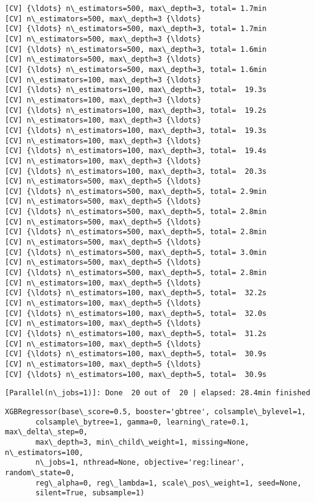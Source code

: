 \documentclass[11pt]{article}
\begin{document}
    \begin{Verbatim}[commandchars=\\\{\}]
[CV] {\ldots} n\_estimators=500, max\_depth=3, total= 1.7min
[CV] n\_estimators=500, max\_depth=3 {\ldots}
[CV] {\ldots} n\_estimators=500, max\_depth=3, total= 1.7min
[CV] n\_estimators=500, max\_depth=3 {\ldots}
[CV] {\ldots} n\_estimators=500, max\_depth=3, total= 1.6min
[CV] n\_estimators=500, max\_depth=3 {\ldots}
[CV] {\ldots} n\_estimators=500, max\_depth=3, total= 1.6min
[CV] n\_estimators=100, max\_depth=3 {\ldots}
[CV] {\ldots} n\_estimators=100, max\_depth=3, total=  19.3s
[CV] n\_estimators=100, max\_depth=3 {\ldots}
[CV] {\ldots} n\_estimators=100, max\_depth=3, total=  19.2s
[CV] n\_estimators=100, max\_depth=3 {\ldots}
[CV] {\ldots} n\_estimators=100, max\_depth=3, total=  19.3s
[CV] n\_estimators=100, max\_depth=3 {\ldots}
[CV] {\ldots} n\_estimators=100, max\_depth=3, total=  19.4s
[CV] n\_estimators=100, max\_depth=3 {\ldots}
[CV] {\ldots} n\_estimators=100, max\_depth=3, total=  20.3s
[CV] n\_estimators=500, max\_depth=5 {\ldots}
[CV] {\ldots} n\_estimators=500, max\_depth=5, total= 2.9min
[CV] n\_estimators=500, max\_depth=5 {\ldots}
[CV] {\ldots} n\_estimators=500, max\_depth=5, total= 2.8min
[CV] n\_estimators=500, max\_depth=5 {\ldots}
[CV] {\ldots} n\_estimators=500, max\_depth=5, total= 2.8min
[CV] n\_estimators=500, max\_depth=5 {\ldots}
[CV] {\ldots} n\_estimators=500, max\_depth=5, total= 3.0min
[CV] n\_estimators=500, max\_depth=5 {\ldots}
[CV] {\ldots} n\_estimators=500, max\_depth=5, total= 2.8min
[CV] n\_estimators=100, max\_depth=5 {\ldots}
[CV] {\ldots} n\_estimators=100, max\_depth=5, total=  32.2s
[CV] n\_estimators=100, max\_depth=5 {\ldots}
[CV] {\ldots} n\_estimators=100, max\_depth=5, total=  32.0s
[CV] n\_estimators=100, max\_depth=5 {\ldots}
[CV] {\ldots} n\_estimators=100, max\_depth=5, total=  31.2s
[CV] n\_estimators=100, max\_depth=5 {\ldots}
[CV] {\ldots} n\_estimators=100, max\_depth=5, total=  30.9s
[CV] n\_estimators=100, max\_depth=5 {\ldots}
[CV] {\ldots} n\_estimators=100, max\_depth=5, total=  30.9s

    \end{Verbatim}

    \begin{Verbatim}[commandchars=\\\{\}]
[Parallel(n\_jobs=1)]: Done  20 out of  20 | elapsed: 28.4min finished

    \end{Verbatim}

    \begin{Verbatim}[commandchars=\\\{\}]
XGBRegressor(base\_score=0.5, booster='gbtree', colsample\_bylevel=1,
       colsample\_bytree=1, gamma=0, learning\_rate=0.1, max\_delta\_step=0,
       max\_depth=3, min\_child\_weight=1, missing=None, n\_estimators=100,
       n\_jobs=1, nthread=None, objective='reg:linear', random\_state=0,
       reg\_alpha=0, reg\_lambda=1, scale\_pos\_weight=1, seed=None,
       silent=True, subsample=1)

    \end{Verbatim}
\end{document}
